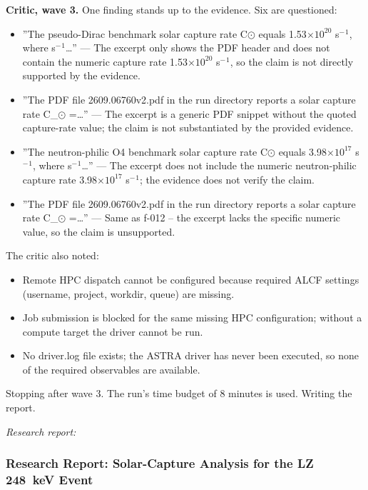\documentclass[11pt,a4paper]{article}
\begin{document}
\textbf{Critic, wave 3.} One finding stands up to the evidence. Six are questioned:

\begin{itemize}
  \item ''The pseudo-Dirac benchmark solar capture rate C$\odot$ equals 1.53$\times$$10^{20}$ s$^-$$^1$, where s$^-$$^1$\ldots{}'' --- The excerpt only shows the PDF header and does not contain the numeric capture rate 1.53$\times$$10^{20}$ s$^-$$^1$, so the claim is not directly supported by the evidence.
  \item ''The PDF file 2609.06760v2.pdf in the run directory reports a solar capture rate C\_$\odot$ =\ldots{}'' --- The excerpt is a generic PDF snippet without the quoted capture-rate value; the claim is not substantiated by the provided evidence.
  \item ''The neutron-philic O4 benchmark solar capture rate C$\odot$ equals 3.98$\times$$10^{17}$ s$^-$$^1$, where s$^-$$^1$\ldots{}'' --- The excerpt does not include the numeric neutron-philic capture rate 3.98$\times$$10^{17}$ s$^-$$^1$; the evidence does not verify the claim.
  \item ''The PDF file 2609.06760v2.pdf in the run directory reports a solar capture rate C\_$\odot$ =\ldots{}'' --- Same as f-012 -- the excerpt lacks the specific numeric value, so the claim is unsupported.
\end{itemize}
The critic also noted:

\begin{itemize}
  \item Remote HPC dispatch cannot be configured because required ALCF settings (username, project, workdir, queue) are missing.
  \item Job submission is blocked for the same missing HPC configuration; without a compute target the driver cannot be run.
  \item No driver.log file exists; the ASTRA driver has never been executed, so none of the required observables are available.
\end{itemize}
Stopping after wave 3. The run's time budget of 8 minutes is used. Writing the report.

\textit{Research report:}\par
\subsubsection*{Research Report: Solar-Capture Analysis for the LZ 248~keV Event}
\end{document}
